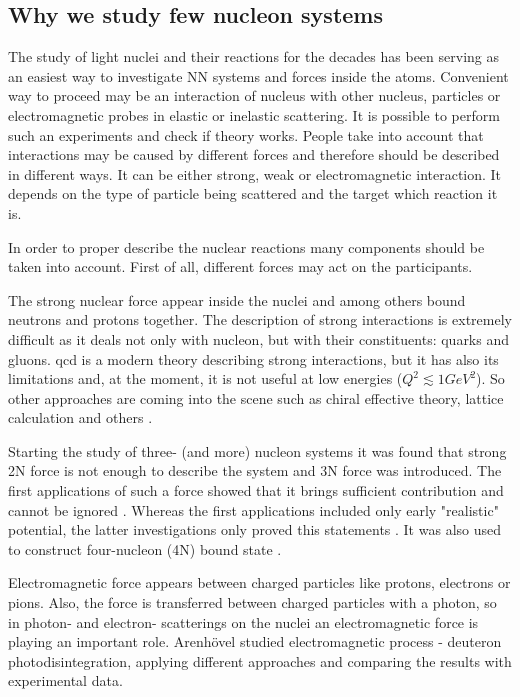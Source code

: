 \subsection*{Why we study few nucleon systems}

The study of light nuclei and their reactions for the decades has been serving as an easiest way
to investigate NN systems and forces inside the atoms. 
Convenient way to proceed may be an interaction of nucleus with
other nucleus, particles or electromagnetic probes in elastic or inelastic scattering.
It is possible to perform such an experiments and check if theory works.
People take into account that interactions may be caused by different forces
and therefore should be described in different ways. It can be
either strong, weak or electromagnetic interaction. It depends
on the type of particle being scattered and the target which reaction it is.

In order to proper describe the nuclear reactions many
components should be taken into account.
First of all, different forces may act on
the participants.


The strong nuclear force appear inside the nuclei and among others bound neutrons 
and protons together. The description of strong interactions is extremely
difficult as it deals not only with nucleon, but with their constituents: quarks
and gluons. \gls*{qcd} is a modern theory
describing strong interactions, but it has also its limitations and, at the moment,
it is not useful at low energies ($Q^2 \lesssim 1 GeV^2$).
So other approaches are coming into the scene such as 
chiral effective theory, lattice calculation and others \cite{IOFFE2006232}.

Starting the study of three- (and more) nucleon systems it was found that 
strong 2N force is not enough to describe
the system and 3N force was introduced. The first applications of such
a force showed that it brings sufficient contribution and cannot be ignored \cite{GLOCKLE1982343}.
Whereas the first applications included only early "realistic" potential, the latter
investigations only proved this statements \cite{StoksPhysRevC49, WIRINGAPhysRevC51}.
It was also used to construct four-nucleon (4N) bound state \cite{NoggaPhysRevLett}.

Electromagnetic force appears between charged particles like protons, electrons or pions.
Also, the force is transferred between charged particles with a photon, so 
in photon- and electron- scatterings on the nuclei an electromagnetic
force is playing an important role. Arenh\"{o}vel \cite{ArenhovelPhotodisint1991} 
studied electromagnetic process - deuteron photodisintegration,
applying different approaches and comparing the results with
experimental data.

